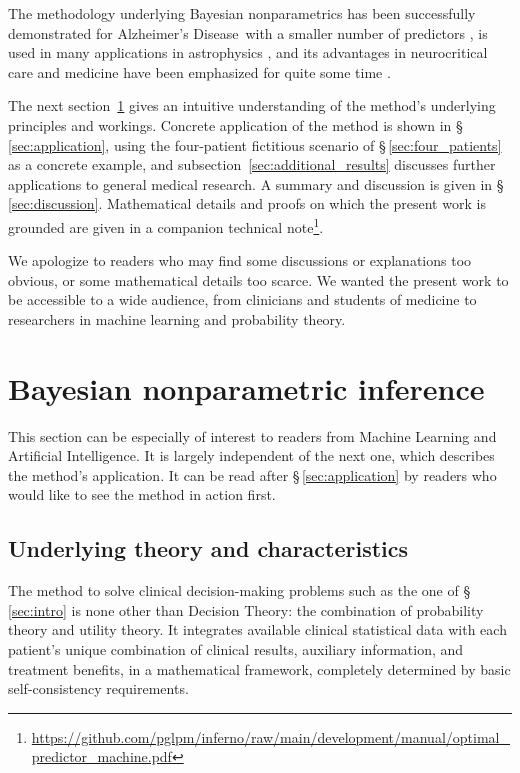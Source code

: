 \documentclass[a4paper,12pt,%
onecolumn,oneside,article,%
british%
]{memoir}
\theoremstyle{remark}
\theoremstyle{innote}
\renewcommand*{\|}[1][]{\nonscript\:#1\vert\nonscript\:\mathopen{}}
\newcommand*{\sect}{\S}%
\newcommand*{\chaps}{chs}%
\newcommand*{\ad}{Alzheimer's Disease}
\begin{document}
The methodology underlying Bayesian nonparametrics has been successfully demonstrated for \ad\ with a smaller number of predictors \autocites{antonianovillalobosetal2014}, is used in many applications in astrophysics \autocites{eht2019,eht2022,delpozzoetal2018}, and its advantages in neurocritical care and medicine have been emphasized for quite some time \autocites{jawaetal2023,tempetal2021,antonianovillalobosetal2014,sidebotham2020,goodman1999}.

The next section~\ref{sec:the_machine} gives an intuitive understanding of the method's underlying principles and workings. Concrete application of the method is shown in \sect\,\ref{sec:application}, using the four-patient fictitious scenario of \sect\,\ref{sec:four_patients} as a concrete example, and subsection~\ref{sec:additional_results} discusses further applications to general medical research. A summary and discussion is given in \sect\,\ref{sec:discussion}. Mathematical details and proofs on which the present work is grounded are given in a companion technical note\footnote{\url{https://github.com/pglpm/inferno/raw/main/development/manual/optimal_predictor_machine.pdf}}.

We apologize to readers who may find some discussions or explanations too obvious, or some mathematical details too scarce. We wanted the present work to be accessible to a wide audience, from clinicians and students of medicine to researchers in machine learning and probability theory.


\bigskip%
\section{Bayesian nonparametric inference}
\label{sec:the_machine}

This section can be especially of interest to readers from Machine Learning and Artificial Intelligence. It is largely independent of the next one, which describes the method's application. It can be read after \sect\,\ref{sec:application} by readers who would like to see the method in action first.

\subsection{Underlying theory and characteristics}
\label{sec:the_machine_principles}

The method to solve clinical decision-making problems such as the one of \sect\,\ref{sec:intro} %
is none other than Decision Theory: the combination of probability theory and utility theory. It integrates available clinical statistical data with each patient's unique combination of clinical results, auxiliary information, and treatment benefits, in a mathematical framework, completely determined by basic self-consistency requirements.\autocites[\chaps~13--14]{jaynes1994_r2003}{vonneumannetal1944_r1955,cox1946,savage1954_r1972,luceetal1957,raiffaetal1961_r2000,raiffa1968_r1970,lindley1971_r1988,kreps1988}
\end{document}
